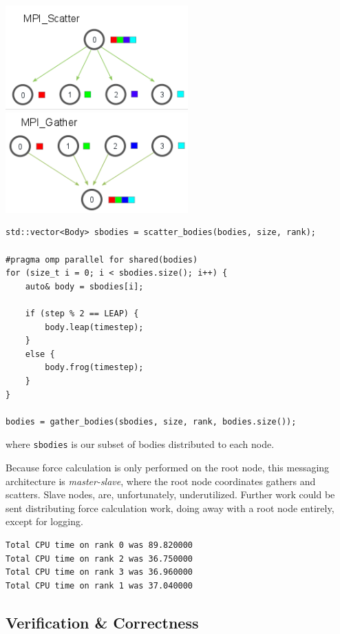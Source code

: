 \documentclass[11pt,a4paper]{article}
\begin{document}
\includegraphics[width=7cm]{mpi_scatter}
\includegraphics[width=7cm]{mpi_gather}

\begin{verbatim}
std::vector<Body> sbodies = scatter_bodies(bodies, size, rank);

#pragma omp parallel for shared(bodies)
for (size_t i = 0; i < sbodies.size(); i++) {
    auto& body = sbodies[i];

    if (step % 2 == LEAP) {
        body.leap(timestep);
    }
    else {
        body.frog(timestep);
    }
}

bodies = gather_bodies(sbodies, size, rank, bodies.size());
\end{verbatim}

where \texttt{sbodies} is our subset of bodies distributed to each node. 

Because force calculation is only performed on the root node, this messaging architecture is \textit{master-slave}, where the root node coordinates gathers and scatters. Slave nodes, are, unfortunately, underutilized. Further work could be sent distributing force calculation work, doing away with a root node entirely, except for logging.

\begin{verbatim}
Total CPU time on rank 0 was 89.820000
Total CPU time on rank 2 was 36.750000
Total CPU time on rank 3 was 36.960000
Total CPU time on rank 1 was 37.040000
\end{verbatim}


\subsection*{Verification \& Correctness}
\end{document}
